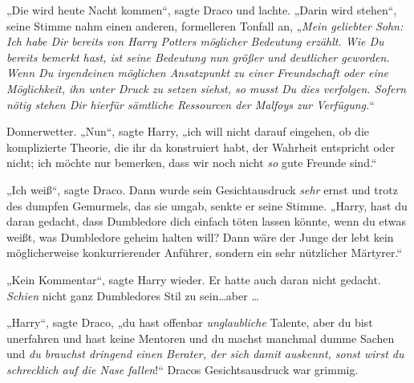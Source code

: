 „Die wird heute Nacht kommen“, sagte Draco und lachte. „Darin wird stehen“, seine Stimme nahm einen anderen, formelleren Tonfall an, „\emph{Mein geliebter Sohn: Ich habe Dir bereits von Harry Potters möglicher Bedeutung erzählt. Wie Du bereits bemerkt hast, ist seine Bedeutung nun größer und deutlicher geworden. Wenn Du irgendeinen möglichen Ansatzpunkt zu einer Freundschaft oder eine Möglichkeit, ihn unter Druck zu setzen siehst, so musst Du dies verfolgen. Sofern nötig stehen Dir hierfür sämtliche Ressourcen der Malfoys zur Verfügung.}“

Donnerwetter. „Nun“, sagte Harry, „ich will nicht darauf eingehen, ob die komplizierte Theorie, die ihr da konstruiert habt, der Wahrheit entspricht oder nicht; ich möchte nur bemerken, dass wir noch nicht \emph{so} gute Freunde sind.“

„Ich weiß“, sagte Draco. Dann wurde sein Gesichtausdruck \emph{sehr} ernst und trotz des dumpfen Gemurmels, das sie umgab, senkte er seine Stimme. „Harry, hast du daran gedacht, dass Dumbledore dich einfach töten lassen könnte, wenn du etwas weißt, was Dumbledore geheim halten will? Dann wäre der Junge der lebt kein möglicherweise konkurrierender Anführer, sondern ein sehr nützlicher Märtyrer.“

„Kein Kommentar“, sagte Harry wieder. Er hatte auch daran nicht gedacht. \emph{Schien} nicht ganz Dumbledores Stil zu sein…aber …

„Harry“, sagte Draco, „du hast offenbar \emph{unglaubliche} Talente, aber du bist unerfahren und hast keine Mentoren und du machst manchmal dumme Sachen und \emph{du brauchst dringend einen Berater, der sich damit auskennt, sonst wirst du schrecklich auf die Nase fallen}!“ Dracos Gesichtsausdruck war grimmig.

